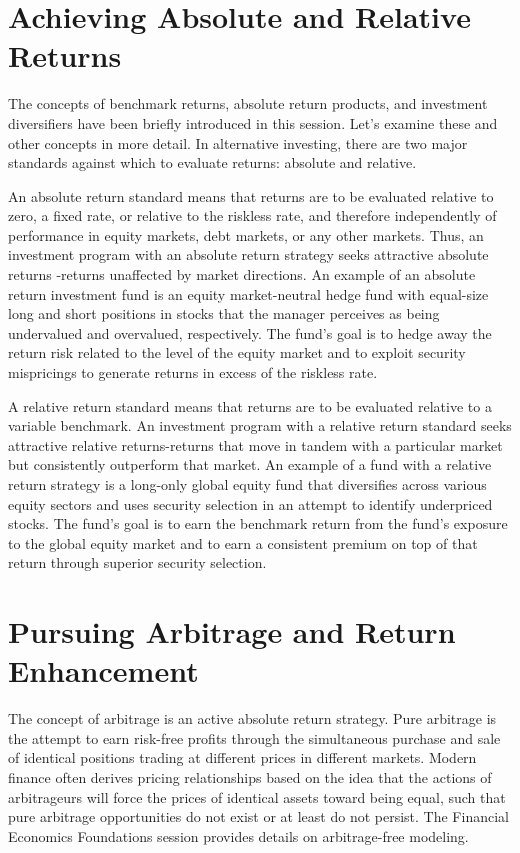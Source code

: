 \documentclass[11pt]{article}
\begin{document}
\section*{Achieving Absolute and Relative Returns}
The concepts of benchmark returns, absolute return products, and investment diversifiers have been briefly introduced in this session. Let's examine these and other concepts in more detail. In alternative investing, there are two major standards against which to evaluate returns: absolute and relative.

An absolute return standard means that returns are to be evaluated relative to zero, a fixed rate, or relative to the riskless rate, and therefore independently of performance in equity markets, debt markets, or any other markets. Thus, an investment program with an absolute return strategy seeks attractive absolute returns -returns unaffected by market directions. An example of an absolute return investment fund is an equity market-neutral hedge fund with equal-size long and short positions in stocks that the manager perceives as being undervalued and overvalued, respectively. The fund's goal is to hedge away the return risk related to the level of the equity market and to exploit security mispricings to generate returns in excess of the riskless rate.

A relative return standard means that returns are to be evaluated relative to a variable benchmark. An investment program with a relative return standard seeks attractive relative returns-returns that move in tandem with a particular market but consistently outperform that market. An example of a fund with a relative return strategy is a long-only global equity fund that diversifies across various equity sectors and uses security selection in an attempt to identify underpriced stocks. The fund's goal is to earn the benchmark return from the fund's exposure to the global equity market and to earn a consistent premium on top of that return through superior security selection.

\section*{Pursuing Arbitrage and Return Enhancement}
The concept of arbitrage is an active absolute return strategy. Pure arbitrage is the attempt to earn risk-free profits through the simultaneous purchase and sale of identical positions trading at different prices in different markets. Modern finance often derives pricing relationships based on the idea that the actions of arbitrageurs will force the prices of identical assets toward being equal, such that pure arbitrage opportunities do not exist or at least do not persist. The Financial Economics Foundations session provides details on arbitrage-free modeling.
\end{document}
